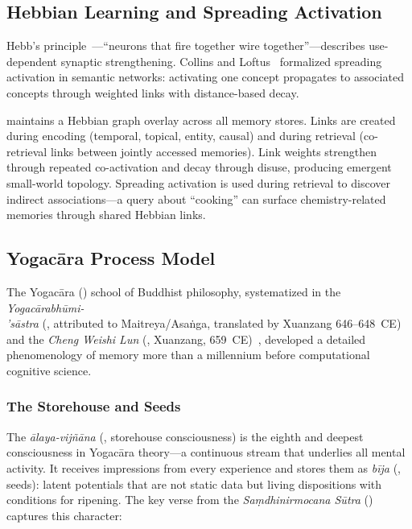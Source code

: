 \subsection{Hebbian Learning and Spreading Activation}

Hebb's principle~\cite{hebb1949}---``neurons that fire together wire
together''---describes use-dependent synaptic strengthening. Collins and
Loftus~\cite{collins1975} formalized spreading activation in semantic
networks: activating one concept propagates to associated concepts through
weighted links with distance-based decay.

\alaya{} maintains a Hebbian graph overlay across all memory stores. Links
are created during encoding (temporal, topical, entity, causal) and during
retrieval (co-retrieval links between jointly accessed memories). Link
weights strengthen through repeated co-activation and decay through disuse,
producing emergent small-world topology. Spreading activation is used during
retrieval to discover indirect associations---a query about ``cooking'' can
surface chemistry-related memories through shared Hebbian links.

\subsection{Yogac\=ara Process Model}
\label{sec:yogacara}

The Yogac\=ara () school of Buddhist philosophy,
systematized in the \emph{Yogac\=arabh\=umi-\\'s\=astra}
(, attributed to Maitreya/Asa\.{n}ga, translated by
Xuanzang 646--648~CE)~\cite{yogacarabhumi} and the \emph{Cheng Weishi
Lun} (, Xuanzang, 659~CE)~\cite{chengweishilun},
developed a detailed phenomenology of memory more than a millennium
before computational cognitive science.

\subsubsection{The Storehouse and Seeds}

The \emph{\=alaya-vij\~n\=ana} (, storehouse
consciousness) is the eighth and deepest consciousness in Yogac\=ara
theory---a continuous stream that underlies all mental activity.  It
receives impressions from every experience and stores them as
\emph{b\=ija} (, seeds): latent potentials that are not
static data but living dispositions with conditions for ripening.
The key verse from the \emph{Sa\d{m}dhinirmocana S\=utra}
()~\cite{samdhinirmocana} captures this character:


